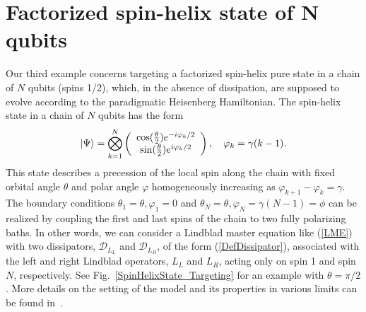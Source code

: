 \documentclass[aps,pra,letterpaper,twocolumn,showpacs,superscriptaddress,floatfix,longbibliography]{revtex4-1}
\begin{document}
\section{Factorized spin-helix state of $\bm{N}$ qubits}
Our third example concerns targeting a factorized spin-helix pure
state in a chain of $N$ qubits (spins 1/2), which, in the absence of
dissipation, are supposed to evolve according to the paradigmatic
Heisenberg Hamiltonian.  The spin-helix state in a chain of $N$ qubits
has the form
\begin{align}
  |{\Psi}\rangle = \bigotimes_{k=1}^N \left(
    \begin{array}{c}
      \cos(\frac{\theta}{2})  e^{-i\varphi_k/2}
      \\
      \sin(\frac{\theta}{2})  e^{i\varphi_k/2}
    \end{array}
  \right), \quad \varphi_k = \gamma(k-1).
  \label{XXZtargetedstate}
\end{align}
This state describes a precession of the local spin along the chain
with fixed orbital angle $\theta$ and polar angle $\varphi$
homogeneously increasing as $\varphi_{k+1}-\varphi_{k}= \gamma$. The
boundary conditions $\theta_1=\theta, \varphi_1=0$ and
$\theta_N=\theta, \varphi_N=\gamma(N-1)=\phi$ can be realized by
coupling the first and last spins of the chain to two fully polarizing
baths.  In other words, we can consider a Lindblad master equation
like (\ref{LME}) with two dissipators, $\mathcal{D}_{L_L}$ and
$\mathcal{D}_{L_R}$, of the form (\ref{DefDissipator}), associated
with the left and right Lindblad operators, $L_L$ and $L_R$, acting
only on spin 1 and spin $N$, respectively. See
Fig.~\ref{SpinHelixState_Targeting} for an example with
$\theta=\pi/2$. More details on the setting of the model and its
properties in various limits can be found
in~\cite{XYweak,XYtwist,MPA,MPA-PRE2013,ProsenExact2011}.
\end{document}
